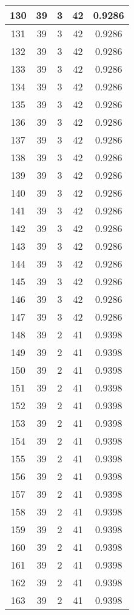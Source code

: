 \documentclass[letterpaper, 12pt]{article}
\begin{document}
\begin{longtable}{|c|c|c|c|c|}
\hline
130 & 39 & 3 & 42 & 0.9286 \\
\hline
131 & 39 & 3 & 42 & 0.9286 \\
\hline
132 & 39 & 3 & 42 & 0.9286 \\
\hline
133 & 39 & 3 & 42 & 0.9286 \\
\hline
134 & 39 & 3 & 42 & 0.9286 \\
\hline
135 & 39 & 3 & 42 & 0.9286 \\
\hline
136 & 39 & 3 & 42 & 0.9286 \\
\hline
137 & 39 & 3 & 42 & 0.9286 \\
\hline
138 & 39 & 3 & 42 & 0.9286 \\
\hline
139 & 39 & 3 & 42 & 0.9286 \\
\hline
140 & 39 & 3 & 42 & 0.9286 \\
\hline
141 & 39 & 3 & 42 & 0.9286 \\
\hline
142 & 39 & 3 & 42 & 0.9286 \\
\hline
143 & 39 & 3 & 42 & 0.9286 \\
\hline
144 & 39 & 3 & 42 & 0.9286 \\
\hline
145 & 39 & 3 & 42 & 0.9286 \\
\hline
146 & 39 & 3 & 42 & 0.9286 \\
\hline
147 & 39 & 3 & 42 & 0.9286 \\
\hline
148 & 39 & 2 & 41 & 0.9398 \\
\hline
149 & 39 & 2 & 41 & 0.9398 \\
\hline
150 & 39 & 2 & 41 & 0.9398 \\
\hline
151 & 39 & 2 & 41 & 0.9398 \\
\hline
152 & 39 & 2 & 41 & 0.9398 \\
\hline
153 & 39 & 2 & 41 & 0.9398 \\
\hline
154 & 39 & 2 & 41 & 0.9398 \\
\hline
155 & 39 & 2 & 41 & 0.9398 \\
\hline
156 & 39 & 2 & 41 & 0.9398 \\
\hline
157 & 39 & 2 & 41 & 0.9398 \\
\hline
158 & 39 & 2 & 41 & 0.9398 \\
\hline
159 & 39 & 2 & 41 & 0.9398 \\
\hline
160 & 39 & 2 & 41 & 0.9398 \\
\hline
161 & 39 & 2 & 41 & 0.9398 \\
\hline
162 & 39 & 2 & 41 & 0.9398 \\
\hline
163 & 39 & 2 & 41 & 0.9398 \\

\end{longtable}
\end{document}
